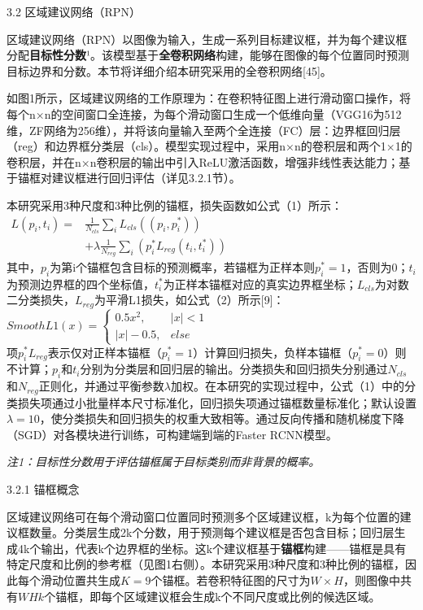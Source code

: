 3.2 区域建议网络（RPN）

区域建议网络（RPN）以图像为输入，生成一系列目标建议框，并为每个建议框分配\textbf{目标性分数}¹。该模型基于\textbf{全卷积网络}构建，能够在图像的每个位置同时预测目标边界和分数。本节将详细介绍本研究采用的全卷积网络{[}45{]}。

如图1所示，区域建议网络的工作原理为：在卷积特征图上进行滑动窗口操作，将每个n×n的空间窗口全连接，为每个滑动窗口生成一个低维向量（VGG16为512维，ZF网络为256维），并将该向量输入至两个全连接（FC）层：边界框回归层（reg）和边界框分类层（cls）。模型实现过程中，采用n×n的卷积层和两个1×1的卷积层，并在n×n卷积层的输出中引入ReLU激活函数，增强非线性表达能力；基于锚框对建议框进行回归评估（详见3.2.1节）。

本研究采用3种尺度和3种比例的锚框，损失函数如公式（1）所示：\\
\(\begin{aligned} L\left(p_{i}, t_{i}\right)= & \frac{1}{N_{c l s}} \sum_{i} L_{c l s}\left(\left(p_{i}, p_{i}^{*}\right)\right) \\ & +\lambda \frac{1}{N_{reg }} \sum_{i}\left(p_{i}^{*} L_{r e g}\left(t_{i}, t_{i}^{*}\right)\right) \end{aligned}\)\\
其中，\(p_{i}\)为第i个锚框包含目标的预测概率，若锚框为正样本则\(p_{i}^{*}=1\)，否则为0；\(t_{i}\)为预测边界框的四个坐标值，\(t_{i}^{*}\)为正样本锚框对应的真实边界框坐标；\(L_{cls}\)为对数二分类损失，\(L_{reg}\)为平滑L1损失，如公式（2）所示{[}9{]}：\\
\(Smooth L 1(x)=\begin{cases}0.5 x^{2}, & |x|<1 \\ |x|-0.5, & else\end{cases}\)\\
项\(p_{i}^{*} L_{reg }\)表示仅对正样本锚框（\(p_{i}^{*}=1\)）计算回归损失，负样本锚框（\(p_{i}^{*}=0\)）则不计算；\(p_{i}\)和\(t_{i}\)分别为分类层和回归层的输出。分类损失和回归损失分别通过\(N_{cls}\)和\(N_{reg}\)正则化，并通过平衡参数\(λ\)加权。在本研究的实现过程中，公式（1）中的分类损失项通过小批量样本尺寸标准化，回归损失项通过锚框数量标准化；默认设置\(λ=10\)，使分类损失和回归损失的权重大致相等。通过反向传播和随机梯度下降（SGD）对各模块进行训练，可构建端到端的Faster
RCNN模型。

\emph{注1：目标性分数用于评估锚框属于目标类别而非背景的概率。}

3.2.1 锚框概念

区域建议网络可在每个滑动窗口位置同时预测多个区域建议框，k为每个位置的建议框数量。分类层生成2k个分数，用于预测每个建议框是否包含目标；回归层生成4k个输出，代表k个边界框的坐标。这k个建议框基于\textbf{锚框}构建------锚框是具有特定尺度和比例的参考框（见图1右侧）。本研究采用3种尺度和3种比例的锚框，因此每个滑动位置共生成\(K=9\)个锚框。若卷积特征图的尺寸为\(W×H\)，则图像中共有\(WHk\)个锚框，即每个区域建议框会生成k个不同尺度或比例的候选区域。

